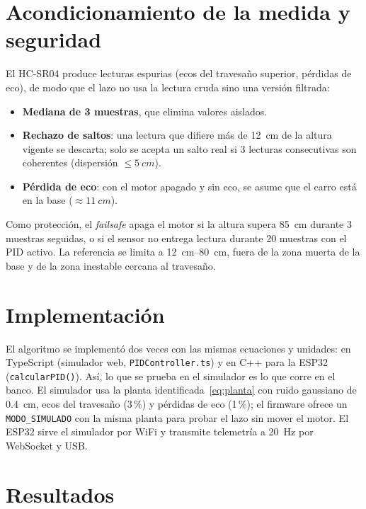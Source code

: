 \documentclass[conference,10pt]{IEEEtran}
\begin{document}
\section{Acondicionamiento de la medida y seguridad}
El HC-SR04 produce lecturas espurias (ecos del travesaño superior, pérdidas de eco), de modo que el lazo no usa la lectura cruda sino una versión filtrada:
\begin{itemize}
\item \textbf{Mediana de 3 muestras}, que elimina valores aislados.
\item \textbf{Rechazo de saltos}: una lectura que difiere más de \SI{12}{cm} de la altura vigente se descarta; solo se acepta un salto real si 3 lecturas consecutivas son coherentes (dispersión $\leq\SI{5}{cm}$).
\item \textbf{Pérdida de eco}: con el motor apagado y sin eco, se asume que el carro está en la base ($\approx\SI{11}{cm}$).
\end{itemize}
Como protección, el \textit{failsafe} apaga el motor si la altura supera \SI{85}{cm} durante 3 muestras seguidas, o si el sensor no entrega lectura durante 20 muestras con el PID activo. La referencia se limita a \SIrange{12}{80}{cm}, fuera de la zona muerta de la base y de la zona inestable cercana al travesaño.

\section{Implementación}
El algoritmo se implementó dos veces con las mismas ecuaciones y unidades: en TypeScript (simulador web, \texttt{PIDController.ts}) y en C++ para la ESP32 (\texttt{calcularPID()}). Así, lo que se prueba en el simulador es lo que corre en el banco. El simulador usa la planta identificada~\eqref{eq:planta} con ruido gaussiano de \SI{0.4}{cm}, ecos del travesaño (3\,\%) y pérdidas de eco (1\,\%); el firmware ofrece un \texttt{MODO\_SIMULADO} con la misma planta para probar el lazo sin mover el motor. El ESP32 sirve el simulador por WiFi y transmite telemetría a \SI{20}{Hz} por WebSocket y USB.

\section{Resultados}
\end{document}
